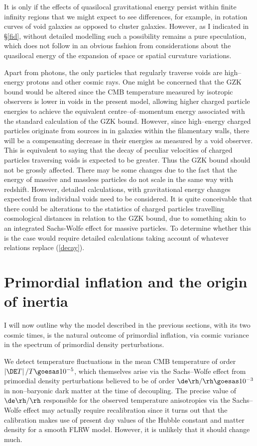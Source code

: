 \documentclass[12pt]{iopart}
\begin{document}
It is only if the effects of quasilocal gravitational energy
persist within finite infinity regions that we might expect to see
differences, for example, in rotation curves of void galaxies as opposed
to cluster galaxies. However, as I indicated in \S\ref{fid}, without
detailed modelling such a possibility remains a pure speculation, which
does not follow in an obvious fashion from considerations about
the quasilocal energy of the expansion of space or spatial curvature
variations.

Apart from photons, the only particles that regularly traverse voids are
high--energy protons and other cosmic rays. One might be concerned that the
GZK bound \cite{gzk} would be altered since the CMB temperature measured
by isotropic observers is lower in voids in the present model, allowing
higher charged particle energies to achieve the equivalent
centre--of--momentum energy associated with the standard calculation of
the GZK bound. However, since high--energy charged particles originate
from sources in in galaxies within the filamentary walls, there will be a
compensating decrease in their energies as measured by a void observer. This
is equivalent to saying that the decay of peculiar velocities of charged
particles traversing voids is expected to be greater. Thus the GZK bound
should not be grossly affected. There may be some changes due to the fact
that the energy of massive and massless particles do not scale in the
same way with redshift. However, detailed calculations, with gravitational
energy changes expected from individual voids need to be considered. It is
quite conceivable that there could be alterations to the statistics of
charged particles travelling cosmological distances in relation to the GZK
bound, due to something akin to an integrated Sachs-Wolfe effect for massive
particles. To determine whether this is the case would require detailed
calculations taking account of whatever relations replace (\ref{decay}).

\section{Primordial inflation and the origin of inertia
\label{inflation}}

I will now outline why the model described in the previous sections, with
its two cosmic times, is the natural outcome of primordial inflation, via
cosmic variance in the spectrum of primordial density perturbations.

We detect temperature fluctuations in the mean CMB temperature of order
$\left|\DE T\right|/T\goesas10^{-5}$, which themselves arise via the
Sachs--Wolfe effect from primordial density perturbations believed to be of
order $\de\rh/\rh\goesas10^{-3}$ in non--baryonic dark matter at the time of
decoupling. The precise value of $\de\rh/\rh$ responsible for the observed
temperature anisotropies via the Sachs--Wolfe effect may actually require
recalibration since it turns out that the calibration makes use of
present day values of the Hubble constant and matter density for a
smooth FLRW model. However, it is unlikely that it should change much.
\end{document}
